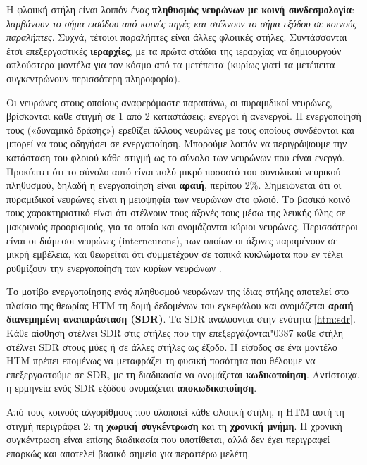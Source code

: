 	Η φλοιική στήλη είναι λοιπόν ένας \textbf{πληθυσμός νευρώνων με κοινή συνδεσμολογία}: \textit{λαμβάνουν το σήμα εισόδου από κοινές πηγές και στέλνουν το σήμα εξόδου σε κοινούς παραλήπτες}.
	Συχνά, τέτοιοι παραλήπτες είναι άλλες φλοιικές στήλες.
	Συντάσσονται έτσι επεξεργαστικές \textbf{ιεραρχίες}, με τα πρώτα στάδια της ιεραρχίας να δημιουργούν απλούστερα μοντέλα για τον κόσμο από τα μετέπειτα
	(κυρίως γιατί τα μετέπειτα συγκεντρώνουν περισσότερη πληροφορία).

	Οι νευρώνες στους οποίους αναφερόμαστε παραπάνω, οι πυραμιδικοί νευρώνες, βρίσκονται κάθε στιγμή σε 1 από 2 καταστάσεις: ενεργοί ή ανενεργοί.
	Η ενεργοποίησή τους («δυναμικό δράσης») ερεθίζει άλλους νευρώνες με τους οποίους συνδέονται και μπορεί να τους οδηγήσει σε ενεργοποίηση.
	Μπορούμε λοιπόν να περιγράψουμε την κατάσταση του φλοιού κάθε στιγμή ως το σύνολο των νευρώνων που είναι ενεργό.
	Προκύπτει ότι το σύνολο αυτό είναι πολύ μικρό ποσοστό του συνολικού νευρικού πληθυσμού, δηλαδή η ενεργοποίηση είναι \textbf{αραιή}, περίπου 2\%.
	Σημειώνεται ότι οι πυραμιδικοί νευρώνες είναι η μειοψηφία των νευρώνων στο φλοιό.
	Το βασικό κοινό τους χαρακτηριστικό είναι ότι στέλνουν τους άξονές τους μέσω της λευκής ύλης σε μακρινούς προορισμούς, για το οποίο και ονομάζονται κύριοι νευρώνες.
	Περισσότεροι είναι οι διάμεσοι νευρώνες (interneurons), των οποίων οι άξονες παραμένουν σε μικρή εμβέλεια, και θεωρείται ότι συμμετέχουν σε τοπικά κυκλώματα
	που εν τέλει ρυθμίζουν την ενεργοποίηση των κυρίων νευρώνων \parencite{freundInterneurons2008}.

	Το μοτίβο ενεργοποίησης ενός πληθυσμού νευρώνων της ίδιας στήλης αποτελεί στο πλαίσιο της θεωρίας HTM τη δομή δεδομένων του εγκεφάλου
	και ονομάζεται \textbf{αραιή διανεμημένη αναπαράσταση (SDR)}.
  Τα SDR αναλύονται στην ενότητα \ref{htm:sdr}.
	Κάθε αίσθηση στέλνει SDR στις στήλες που την επεξεργάζονται\char"0387  κάθε στήλη στέλνει SDR στους μύες ή σε άλλες στήλες ως έξοδο.
	Η είσοδος σε ένα μοντέλο HTM πρέπει επομένως να μεταφράζει τη φυσική ποσότητα που θέλουμε να επεξεργαστούμε σε SDR, με τη διαδικασία να ονομάζεται \textbf{κωδικοποίηση}.
	Αντίστοιχα, η ερμηνεία ενός SDR εξόδου ονομάζεται \textbf{αποκωδικοποίηση}.

	Από τους κοινούς αλγορίθμους που υλοποιεί κάθε φλοιική στήλη, η HTM αυτή τη στιγμή περιγράφει 2: τη \textbf{χωρική συγκέντρωση} και τη \textbf{χρονική μνήμη}.
	Η χρονική συγκέντρωση είναι επίσης διαδικασία που υποτίθεται, αλλά δεν έχει περιγραφεί επαρκώς και αποτελεί βασικό σημείο για περαιτέρω μελέτη.

